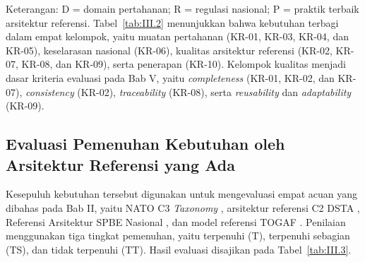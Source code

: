 Keterangan: D = domain pertahanan; R = regulasi nasional; P = praktik terbaik arsitektur referensi. Tabel~\ref{tab:III.2} menunjukkan bahwa kebutuhan terbagi dalam empat kelompok, yaitu muatan pertahanan (KR-01, KR-03, KR-04, dan KR-05), keselarasan nasional (KR-06), kualitas arsitektur referensi (KR-02, KR-07, KR-08, dan KR-09), serta penerapan (KR-10). Kelompok kualitas menjadi dasar kriteria evaluasi pada Bab V, yaitu \textit{completeness} (KR-01, KR-02, dan KR-07), \textit{consistency} (KR-02), \textit{traceability} (KR-08), serta \textit{reusability} dan \textit{adaptability} (KR-09).

\subsection{Evaluasi Pemenuhan Kebutuhan oleh Arsitektur Referensi yang Ada}
\label{sec:III.1.4}

Kesepuluh kebutuhan tersebut digunakan untuk mengevaluasi empat acuan yang dibahas pada Bab II, yaitu NATO C3 \textit{Taxonomy} \cite{NATOC3Taxonomy}, arsitektur referensi C2 DSTA \cite{Chang2009}, Referensi Arsitektur SPBE Nasional \cite{Perpres132Tahun2022}, dan model referensi TOGAF \cite{TOGAF2022}. Penilaian menggunakan tiga tingkat pemenuhan, yaitu terpenuhi (T), terpenuhi sebagian (TS), dan tidak terpenuhi (TT). Hasil evaluasi disajikan pada Tabel~\ref{tab:III.3}.

